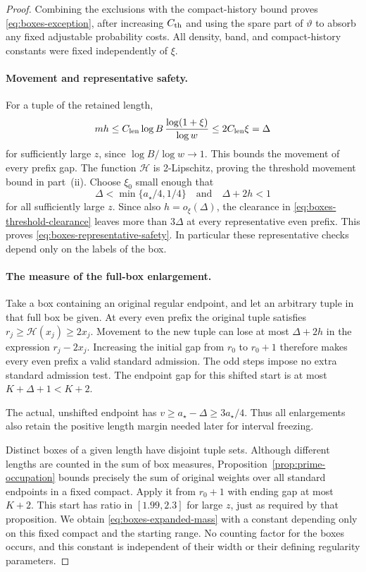 \begin{proof}
Combining the exclusions with the compact-history bound proves
\eqref{eq:boxes-exception}, after increasing $C_{\rm th}$ and
using the spare part of $\vartheta$ to absorb any fixed adjustable
probability costs.  All density, band, and compact-history
constants were fixed independently of $\xi$.

\paragraph{Movement and representative safety.}
For a tuple of the retained length,
\[
 m h\le C_{\rm len}\log B\,
           \frac{\log(1+\xi)}{\log w}
       \le2C_{\rm len}\xi=\Delta
\]
for sufficiently large $z$, since $\log B/\log w\to1$.
This bounds the movement of every prefix gap.  The function $\mathcal H$
is 2-Lipschitz, proving the threshold movement bound in part~(ii).
Choose $\xi_0$ small enough that
\begin{equation}\label{eq:boxes-width-requirements}
 \Delta<\min\{a_\star/4,1/4\}
 \quad\text{and}\quad \Delta+2h<1
\end{equation}
for all sufficiently large $z$.  Since also $h=o_\xi(\Delta)$,
the clearance in \eqref{eq:boxes-threshold-clearance} leaves more
than $3\Delta$ at every representative even prefix.  This proves
\eqref{eq:boxes-representative-safety}.  In particular these
representative checks depend only on the labels of the box.

\paragraph{The measure of the full-box enlargement.}
Take a box containing an original regular endpoint, and let an
arbitrary tuple in that full box be given.  At every even prefix
the original tuple satisfies $r_j\ge \mathcal H(x_j)\ge2x_j$.  Movement
to the new tuple can lose at most $\Delta+2h$ in the expression
$r_j-2x_j$.  Increasing the initial gap from $r_0$ to $r_0+1$
therefore makes every even prefix a valid standard admission.
The odd steps impose no extra standard admission test.  The
endpoint gap for this shifted start is at most
$K+\Delta+1<K+2$.

The actual, unshifted endpoint has $v\ge a_\star-\Delta
\ge3a_\star/4$.  Thus all enlargements also retain the positive
length margin needed later for interval freezing.

Distinct boxes of a given length have disjoint tuple sets.
Although different lengths are counted in the sum of box measures,
Proposition~\ref{prop:prime-occupation} bounds precisely the sum
of original weights over all standard endpoints in a fixed compact.
Apply it from $r_0+1$ with ending gap at most $K+2$.  This start has
ratio in $[1.99,2.3]$ for large $z$, just as required by that
proposition.  We obtain \eqref{eq:boxes-expanded-mass} with a
constant depending only on this fixed compact and the starting
range.  No counting factor for the boxes occurs, and this
constant is independent of their width or their defining
regularity parameters.


\end{proof}
